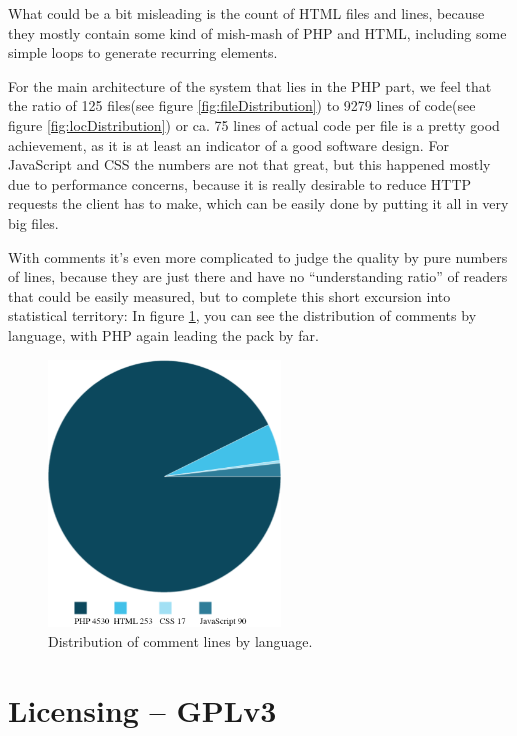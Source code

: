 What could be a bit misleading is the count of HTML files and lines, because they mostly contain some kind of mish-mash of PHP and HTML, including some simple loops to generate recurring elements.

For the main architecture of the system that lies in the PHP part, we feel that the ratio of 125 files(see figure \ref{fig:fileDistribution}) to 9279 lines of code(see figure \ref{fig:locDistribution}) or ca. 75 lines of actual code per file is a pretty good achievement, as it is at least an indicator of a good software design. For JavaScript and CSS the numbers 
are not that great, but this happened mostly due to performance concerns, because it is 
really desirable to reduce HTTP requests the client has to make, which can be easily done by putting it all in very big files.

With comments it's even more complicated to judge the quality by pure numbers of lines,
because they are just there and have no \enquote{understanding ratio} of readers that could be easily measured, but to complete this short excursion into statistical territory: In figure \ref{fig:commentDistribution}, you can see the distribution of comments by language, with PHP again leading the pack by far.

\begin{figure}[!h]
  \centering
    \includegraphics[width=0.55\textwidth]{images/comments.png}
  \caption{Distribution of comment lines by language.}
  \label{fig:commentDistribution}
\end{figure}

\section{Licensing -- GPLv3}

